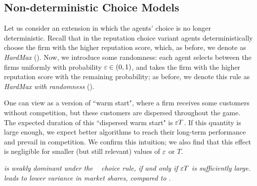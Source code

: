 \documentclass[../competing_bandits.tex]{subfiles}
\begin{document}
\subsection{Non-deterministic Choice Models}\label{sec:non_greedy}

Let us consider an extension in which the agents' choice is no longer deterministic. Recall that in the reputation choice variant agents deterministically choose the firm with the higher reputation score, which, as before, we denote as \emph{HardMax} (\HM). Now, we introduce some randomness: each agent selects between the firms uniformly with probability $\varepsilon\in (0,1)$, and takes the firm with the higher reputation score with the remaining probability; as before, we denote this rule as \emph{HardMax with randomness} (\HMR).

One can view \HMR as a version of ``warm start", where a firm receives some customers without competition, but these customers are dispersed throughout the game. The expected duration of this ``dispersed warm start" is $\varepsilon T$. If this quantity is large enough, we expect better algorithms to reach their long-term performance and prevail in competition. We confirm this intuition; we also find that this effect is negligible for smaller (but still relevant) values of $\varepsilon$ or $T$.


\begin{finding}\label{find:non_greedy_choice}
\textit{\TS is weakly dominant under the \HMR~ choice rule, if and only if $\varepsilon T$ is sufficiently large. \HMR leads to lower variance in market shares, compared to \HM.}
\end{finding}
\end{document}
